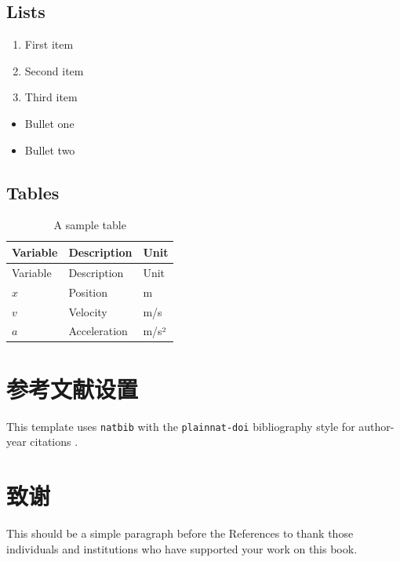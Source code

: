 \documentclass[
  11pt,
  onesidefontset=none,
]{ctexbook}
\providecommand{\tightlist}{%
  \setlength{\itemsep}{0pt}\setlength{\parskip}{0pt}}
\theoremstyle{plain}
\theoremstyle{plain}
\theoremstyle{definition}
\theoremstyle{plain}
\theoremstyle{remark}
\begin{document}
\section{Lists}\label{lists}

\begin{enumerate}
\def\labelenumi{\arabic{enumi}.}
\tightlist
\item
  First item
\item
  Second item
\item
  Third item
\end{enumerate}

\begin{itemize}
\tightlist
\item
  Bullet one
\item
  Bullet two
\end{itemize}

\section{Tables}\label{tables}

\begin{longtable}[]{@{}lll@{}}
\caption{A sample table}\label{tbl-sample}\tabularnewline
\toprule\noalign{}
Variable & Description & Unit \\
\midrule\noalign{}
\endfirsthead
\toprule\noalign{}
Variable & Description & Unit \\
\midrule\noalign{}
\endhead
\bottomrule\noalign{}
\endlastfoot
\(x\) & Position & m \\
\(v\) & Velocity & m/s \\
\(a\) & Acceleration & m/s² \\
\end{longtable}

\chapter{参考文献设置}\label{ux53c2ux8003ux6587ux732eux8bbeux7f6e}

This template uses \texttt{natbib} with the \texttt{plainnat-doi}
bibliography style for author-year citations
\citet{karatzas1991brownian}.

\chapter*{致谢}\label{ux81f4ux8c22}

This should be a simple paragraph before the References to thank those
individuals and institutions who have supported your work on this book.
\end{document}
